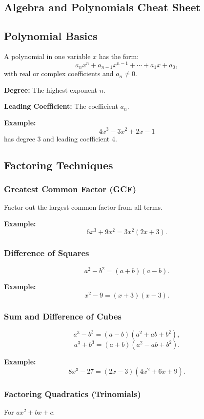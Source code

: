 \documentclass{article}
\begin{document}
\begin{multicols}{2}

\section*{Algebra and Polynomials Cheat Sheet}

\subsection*{Polynomial Basics}
A polynomial in one variable \(x\) has the form:
\[
a_n x^n + a_{n-1} x^{n-1} + \cdots + a_1 x + a_0,
\]
with real or complex coefficients and \(a_n \neq 0\).

\textbf{Degree:} The highest exponent \(n\).

\textbf{Leading Coefficient:} The coefficient \(a_n\).

\textbf{Example:}
\[
4x^3 - 3x^2 + 2x - 1
\]
has degree 3 and leading coefficient 4.

\subsection*{Factoring Techniques}

\subsubsection*{Greatest Common Factor (GCF)}
Factor out the largest common factor from all terms.

\textbf{Example:}
\[
6x^3 + 9x^2 = 3x^2(2x + 3).
\]

\subsubsection*{Difference of Squares}
\[
a^2 - b^2 = (a+b)(a-b).
\]

\textbf{Example:}
\[
x^2 - 9 = (x+3)(x-3).
\]

\subsubsection*{Sum and Difference of Cubes}
\[
a^3 - b^3 = (a - b)(a^2 + ab + b^2),
\]
\[
a^3 + b^3 = (a + b)(a^2 - ab + b^2).
\]

\textbf{Example:}
\[
8x^3 - 27 = (2x - 3)(4x^2 + 6x + 9).
\]

\subsubsection*{Factoring Quadratics (Trinomials)}
For \(ax^2 + bx + c\):


\end{multicols}
\end{document}
